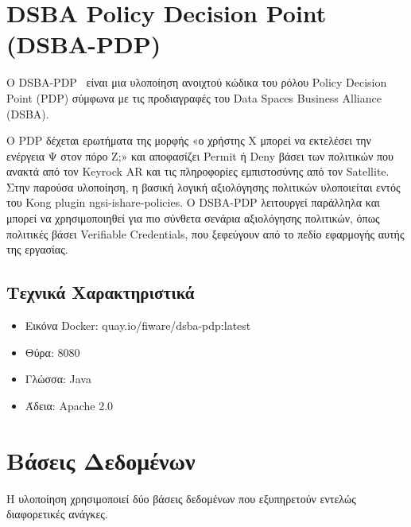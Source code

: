 \section{\textlatin{DSBA Policy Decision Point (DSBA-PDP)}}
\label{sec:dsba-pdp}

Ο \textlatin{DSBA-PDP}~\cite{dsba-pdp2023} είναι μια υλοποίηση
ανοιχτού κώδικα του ρόλου \textlatin{Policy Decision Point (PDP)}
σύμφωνα με τις προδιαγραφές του \textlatin{Data Spaces Business
Alliance (DSBA)}.

Ο \textlatin{PDP} δέχεται ερωτήματα της μορφής «ο χρήστης Χ μπορεί
να εκτελέσει την ενέργεια Ψ στον πόρο Ζ;» και αποφασίζει
\textlatin{Permit} ή \textlatin{Deny} βάσει των πολιτικών που
ανακτά από τον \textlatin{Keyrock AR} και τις πληροφορίες εμπιστοσύνης
από τον \textlatin{Satellite}. Στην παρούσα υλοποίηση, η βασική λογική αξιολόγησης πολιτικών
υλοποιείται εντός του \textlatin{Kong plugin} \textlatin{ngsi-ishare-policies}.
Ο \textlatin{DSBA-PDP} λειτουργεί παράλληλα και μπορεί να
χρησιμοποιηθεί για πιο σύνθετα σενάρια αξιολόγησης πολιτικών,
όπως πολιτικές βάσει \textlatin{Verifiable Credentials}, που
ξεφεύγουν από το πεδίο εφαρμογής αυτής της εργασίας.

\subsection{Τεχνικά Χαρακτηριστικά}
\label{subsec:pdp-tech}

\begin{itemize}
    \item Εικόνα \textlatin{Docker}:
    \textlatin{quay.io/fiware/dsba-pdp:latest}
    \item Θύρα: \textlatin{8080}
    \item Γλώσσα: \textlatin{Java}
    \item Άδεια: \textlatin{Apache 2.0}
\end{itemize}

\section{Βάσεις Δεδομένων}
\label{sec:databases}

Η υλοποίηση χρησιμοποιεί δύο βάσεις δεδομένων που εξυπηρετούν
εντελώς διαφορετικές ανάγκες.

